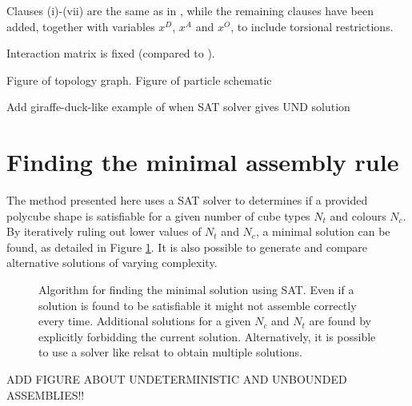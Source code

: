 Clauses (i)-(vii) are the same as in \cite{romano2020designing}, while the remaining clauses have been added, together with variables \(x^D\), \(x^A\) and \(x^O\), to include torsional restrictions.

Interaction matrix is fixed (compared to \cite{romano2020designing}).

Figure of topology graph. Figure of particle schematic

Add giraffe-duck-like example of when SAT solver gives UND solution

\section{Finding the minimal assembly rule}

The method presented here uses a SAT solver to determines if a provided polycube shape is satisfiable for a given number of cube types \(N_t\) and colours \(N_c\). By iteratively ruling out lower values of \(N_t\) and \(N_c\), a minimal solution can be found, as detailed in Figure \ref{fig:sat_alg}. It is also possible to generate and compare alternative solutions of varying complexity.

\begin{figure}
    \centering
    \resizebox{\textwidth}{!}{}
    \caption{Algorithm for finding the minimal solution using SAT. Even if a solution is found to be satisfiable it might not assemble correctly every time. Additional solutions for a given \(N_c\) and \(N_t\) are found by explicitly forbidding the current solution. Alternatively, it is possible to use a solver like relsat to obtain multiple solutions. }
    \label{fig:sat_alg}
\end{figure}

ADD FIGURE ABOUT UNDETERMINISTIC AND UNBOUNDED ASSEMBLIES!!


